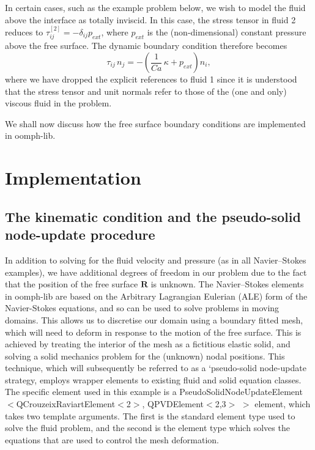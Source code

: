 In certain cases, such as the example problem below, we wish to model the fluid above the interface as totally inviscid. In this case, the stress tensor in fluid 2 reduces to $ \tau_{ij}^{[2]} = - \delta_{ij} p_{ext} $, where $ p_{ext} $ is the (non-\/dimensional) constant pressure above the free surface. The dynamic boundary condition therefore becomes \[ \tau_{ij} \, n_j = - \left( \frac{1}{Ca} \, \kappa + p_{ext} \right) n_i, \] where we have dropped the explicit references to fluid 1 since it is understood that the stress tensor and unit normals refer to those of the (one and only) viscous fluid in the problem.

We shall now discuss how the free surface boundary conditions are implemented in {\ttfamily oomph-\/lib}.



 

\hypertarget{index_implementation}{}\section{Implementation}\label{index_implementation}
\hypertarget{index_kinematic_condition_implementation}{}\subsection{The kinematic condition and the pseudo-\/solid node-\/update procedure}\label{index_kinematic_condition_implementation}
In addition to solving for the fluid velocity and pressure (as in all Navier--Stokes examples), we have additional degrees of freedom in our problem due to the fact that the position of the free surface $ \mathbf{R} $ is unknown. The Navier--Stokes elements in {\ttfamily oomph-\/lib} are based on the Arbitrary Lagrangian Eulerian (A\+LE) form of the Navier-\/\+Stokes equations, and so can be used to solve problems in moving domains. This allows us to discretise our domain using a boundary fitted mesh, which will need to deform in response to the motion of the free surface. This is achieved by treating the interior of the mesh as a fictitious elastic solid, and solving a solid mechanics problem for the (unknown) nodal positions. This technique, which will subsequently be referred to as a `pseudo-\/solid node-\/update strategy\textquotesingle{}, employs wrapper elements to existing fluid and solid equation classes. The specific element used in this example is a {\ttfamily Pseudo\+Solid\+Node\+Update\+Element$<$Q\+Crouzeix\+Raviart\+Element$<$2$>$}, {\ttfamily Q\+P\+V\+D\+Element$<$2,3$>$} {\ttfamily $>$} element, which takes two template arguments. The first is the standard element type used to solve the fluid problem, and the second is the element type which solves the equations that are used to control the mesh deformation.


